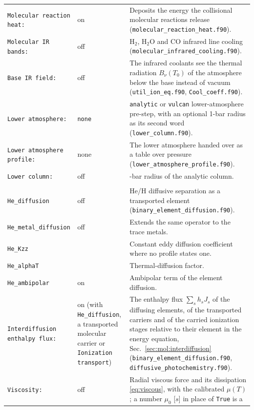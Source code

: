 {\begin{longtable}{@{}>{\raggedright\arraybackslash}p{}>{\raggedright\arraybackslash}p{}>{\raggedright\arraybackslash}p{}@{}}
\texttt{Molecular reaction heat:} & on &
  Deposits the energy the collisional molecular reactions release
  (\texttt{molecular\_reaction\_heat.f90}). \\
\texttt{Molecular IR bands:} & off &
  $\mathrm{H_2}$, $\mathrm{H_2O}$ and CO infrared line cooling
  (\texttt{molecular\_infrared\_cooling.f90}). \\
\texttt{Base IR field:} & off &
  The infrared coolants see the thermal radiation $B_\nu(T_0)$ of the
  atmosphere below the base instead of vacuum (\texttt{util\_ion\_eq.f90},
  \texttt{Cool\_coeff.f90}). \\
\texttt{Lower atmosphere:} & \texttt{none} &
  \texttt{analytic} or \texttt{vulcan} lower-atmosphere pre-step, with an
  optional 1-bar radius as its second word
  (\texttt{lower\_column.f90}). \\
\texttt{Lower atmosphere profile:} & none &
  The lower atmosphere handed over as a table over pressure
  (\texttt{lower\_atmosphere\_profile.f90}). \\
\texttt{Lower column:} & off &
  1-bar radius of the analytic column. \\
\midrule
\multicolumn{3}{l}{\itshape Diffusion and molecular transport}\\
\midrule
\texttt{He\_diffusion} & off &
  He/H diffusive separation as a transported element
  (\texttt{binary\_element\_diffusion.f90}). \\
\texttt{He\_metal\_diffusion} & off &
  Extends the same operator to the trace metals. \\
\texttt{He\_Kzz} & 0 &
  Constant eddy diffusion coefficient where no profile states one. \\
\texttt{He\_alphaT} & 0 &
  Thermal-diffusion factor. \\
\texttt{He\_ambipolar} & on &
  Ambipolar term of the element diffusion. \\
\texttt{Interdiffusion enthalpy flux:} & on (with \texttt{He\_diffusion}, a
  transported molecular carrier or \texttt{Ionization transport}) &
  The enthalpy flux $\sum_s h_sJ_s$ of the diffusing elements, of the
  transported carriers and of the carried ionization stages relative to their
  element in the energy equation,
  Sec.~\ref{sec:mol:interdiffusion} (\texttt{binary\_element\_diffusion.f90},
  \texttt{diffusive\_photochemistry.f90}). \\
\texttt{Viscosity:} & off &
  Radial viscous force and its dissipation \eqref{eq:viscous}, with the
  calibrated $\mu(T)$; a number $\mu_0$ [$s$] in place of \texttt{True} is a

\end{longtable}}
